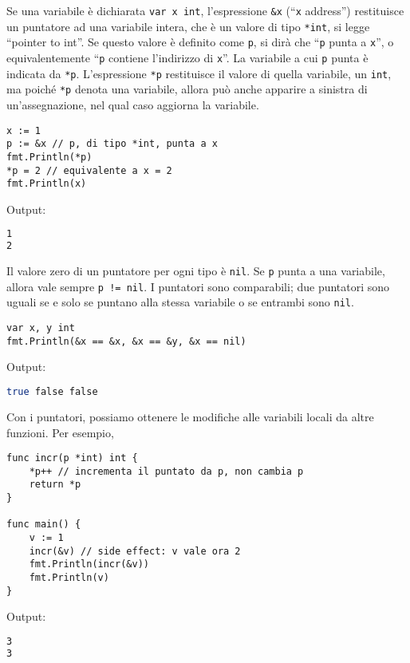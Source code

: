 Se una variabile è dichiarata \verb|var x int|, l'espressione \verb|&x| (``\verb|x| address'') restituisce un puntatore ad una variabile intera, che è un valore di tipo \verb|*int|, si legge ``pointer to int''.
Se questo valore è definito come \verb|p|, si dirà che ``\verb|p| punta a \verb|x|'', o equivalentemente ``\verb|p| contiene l'indirizzo di \verb|x|''.
La variabile a cui \verb|p| punta è indicata da \verb|*p|.
L'espressione \verb|*p| restituisce il valore di quella variabile, un \verb|int|, ma poiché \verb|*p| denota una variabile, allora può anche apparire a sinistra di un'assegnazione, nel qual caso aggiorna la variabile.
\begin{lstlisting}[frame=single, label={lst:lstlisting1-3-2.1}]
x := 1
p := &x // p, di tipo *int, punta a x
fmt.Println(*p)
*p = 2 // equivalente a x = 2
fmt.Println(x)
\end{lstlisting}
Output:
\begin{lstlisting}[language=bash, frame=L, label={lst:lstlisting1-3-2.2}]
1
2
\end{lstlisting}
Il valore zero di un puntatore per ogni tipo è \verb|nil|.
Se \verb|p| punta a una variabile, allora vale sempre \verb|p != nil|.
I puntatori sono comparabili;
due puntatori sono uguali se e solo se puntano alla stessa variabile o se entrambi sono \verb|nil|.
\begin{lstlisting}[frame=single, label={lst:lstlisting1-3-2.3}]
var x, y int
fmt.Println(&x == &x, &x == &y, &x == nil)
\end{lstlisting}
Output:
\begin{lstlisting}[language=bash, frame=L, label={lst:lstlisting1-3-2.4}]
true false false
\end{lstlisting}
Con i puntatori, possiamo ottenere le modifiche alle variabili locali da altre funzioni.
Per esempio,
\begin{lstlisting}[frame=single, label={lst:lstlisting1-3-2.5}]
func incr(p *int) int {
    *p++ // incrementa il puntato da p, non cambia p
    return *p
}

func main() {
    v := 1
    incr(&v) // side effect: v vale ora 2
    fmt.Println(incr(&v))
    fmt.Println(v)
}
\end{lstlisting}
Output:
\begin{lstlisting}[language=bash, frame=L, label={lst:lstlisting1-3-2.6}]
3
3
\end{lstlisting}

